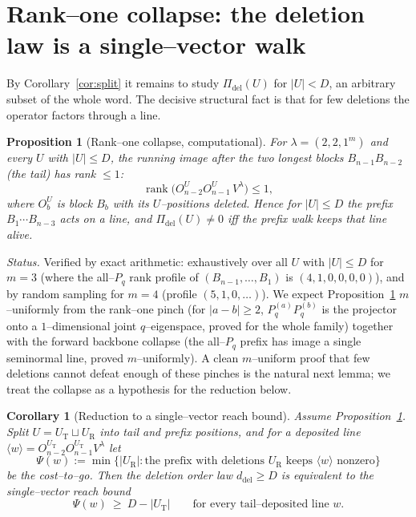 \documentclass[11pt]{article}
\newtheorem{proposition}[theorem]{Proposition}
\newtheorem{corollary}[theorem]{Corollary}
\theoremstyle{definition}
\DeclareMathOperator{\rank}{rank}
\newcommand{\Vlam}{V^\lambda}
\newcommand{\Pq}{P_{q}}
\newcommand{\Pdel}{\Pi_{\mathrm{del}}}
\newcommand{\ddel}{d_{\mathrm{del}}}
\begin{document}
\section{Rank--one collapse: the deletion law is a single--vector walk}\label{sec:collapse}

By Corollary~\ref{cor:split} it remains to study $\Pdel(U)$ for $|U|<D$, an arbitrary subset of
the whole word. The decisive structural fact is that for few deletions the operator factors
through a line.

\begin{proposition}[Rank--one collapse, computational]\label{prop:collapse}
For $\lambda=(2,2,1^m)$ and every $U$ with $|U|\le D$, the running image after the two longest
blocks $B_{n-1}B_{n-2}$ (the tail) has rank $\le1$:
\[
   \rank\bigl(O^U_{n-2}O^U_{n-1}\,\Vlam\bigr)\le1,
\]
where $O^U_b$ is block $B_b$ with its $U$--positions deleted. Hence for $|U|\le D$ the prefix
$B_1\cdots B_{n-3}$ acts on a line, and $\Pdel(U)\neq0$ iff the prefix walk keeps that line
alive.
\end{proposition}

\noindent\emph{Status.} Verified by exact arithmetic: exhaustively over all $U$ with $|U|\le D$
for $m=3$ (where the all--$\Pq$ rank profile of $(B_{n-1},\dots,B_1)$ is $(4,1,0,0,0,0)$), and by
random sampling for $m=4$ (profile $(5,1,0,\dots)$). We expect Proposition~\ref{prop:collapse}
$m$--uniformly from the rank--one pinch (for $|a-b|\ge2$, $\Pq^{(a)}\Pq^{(b)}$ is the projector
onto a $1$--dimensional joint $q$--eigenspace, proved for the whole family) together with the
forward backbone collapse (the all--$\Pq$ prefix has image a single seminormal line, proved
$m$--uniformly). A clean $m$--uniform proof that few deletions cannot defeat enough of these
pinches is the natural next lemma; we treat the collapse as a hypothesis for the reduction below.

\begin{corollary}[Reduction to a single--vector reach bound]\label{cor:reduce}
Assume Proposition~\ref{prop:collapse}. Split $U=U_{\mathrm T}\sqcup U_{\mathrm R}$ into tail and
prefix positions, and for a deposited line $\langle w\rangle=O^{U_{\mathrm T}}_{n-2}
O^{U_{\mathrm T}}_{n-1}\Vlam$ let
\[
   \Psi(w):=\min\{|U_{\mathrm R}|:\text{the prefix with deletions }U_{\mathrm R}\text{ keeps }
   \langle w\rangle\text{ nonzero}\}
\]
be the cost--to--go. Then the deletion order law $\ddel\ge D$ is equivalent to the
\emph{single--vector reach bound}
\begin{equation}\label{eq:reach}
   \Psi(w)\ \ge\ D-|U_{\mathrm T}|\qquad\text{for every tail--deposited line }w .
\end{equation}
\end{corollary}
\end{document}

